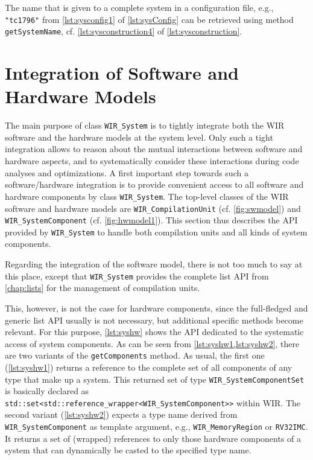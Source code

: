 The name that is given to a complete system in a configuration file, e.g., \texttt{"tc1796"} from \cref{lst:sysconfig1} of \cref{lst:sysConfig} can be retrieved using method \texttt{getSystemName}, cf. \cref{lst:sysconstruction4} of \cref{lst:sysconstruction}.


\section{Integration of Software and Hardware Models}
\label{sec:swhwmodel}

The main purpose of class \texttt{WIR\_System} is to tightly integrate both the \gls{WIR} software and the hardware models at the system level.
Only such a tight integration allows to reason about the mutual interactions between software and hardware aspects, and to systematically consider these interactions during code analyses and optimizations.
A first important step towards such a software/hardware integration is to provide convenient access to all software and hardware components by class \texttt{WIR\_System}.
The top-level classes of the \gls{WIR} software and hardware models are \texttt{WIR\_CompilationUnit} (cf. \cref{fig:swmodel}) and \texttt{WIR\_SystemComponent} (cf. \cref{fig:hwmodel1}).
This section thus describes the \gls{API} provided by \texttt{WIR\_System} to handle both compilation units and all kinds of system components.

Regarding the integration of the software model, there is not too much to say at this place, except that \texttt{WIR\_System} provides the complete list \gls{API} from \cref{chap:lists} for the management of compilation units.

This, however, is not the case for hardware components, since the full-fledged and generic list \gls{API} usually is not necessary, but additional specific methods become relevant.
For this purpose, \cref{lst:syshw} shows the \gls{API} dedicated to the systematic access of system components.
As can be seen from \cref{lst:syshw1,lst:syshw2}, there are two variants of the \texttt{getComponents} method.
As usual, the first one (\cref{lst:syshw1}) returns a reference to the complete set of all components of any type that make up a system.
This returned set of type \texttt{WIR\_SystemComponentSet} is basically declared as \texttt{std::set<std::reference\_wrapper<WIR\_SystemComponent>{}>} within \gls{WIR}.
The second variant (\cref{lst:syshw2}) expects a type name derived from \texttt{WIR\_SystemComponent} as template argument, e.g., \texttt{WIR\_MemoryRegion} or \texttt{RV32IMC}.
It returns a set of (wrapped) references to only those hardware components of a system that can dynamically be casted to the specified type name.

